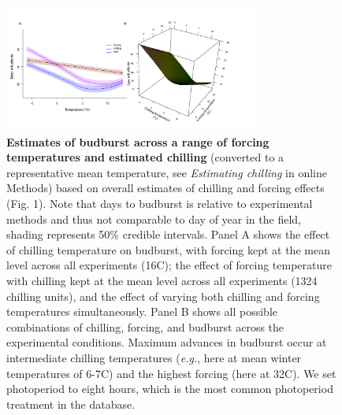 \documentclass{article}
\begin{document}
\begin{figure}[h!]
\centering
\noindent \includegraphics[width=0.75\textwidth]{..//..//analyses/bb_analysis/figures/bbmod_2d3dplot_utah_withPEP.pdf}
\caption{\textbf{Estimates of budburst across a range of forcing temperatures and estimated chilling} (converted to a representative mean temperature, see \emph{Estimating chilling} in online Methods) based on overall estimates of chilling and forcing effects (Fig. 1).  Note that days to budburst is relative to experimental methods and thus not comparable to day of year in the field, shading represents 50\% credible intervals. Panel A shows the effect of chilling temperature on budburst, with forcing kept at the mean level across all experiments (16\degree C);  the effect of forcing temperature with chilling kept at the mean level across all experiments (1324 chilling units), and  the effect of varying both chilling and forcing temperatures simultaneously. Panel B shows all possible combinations of chilling, forcing, and budburst across the experimental conditions.
Maximum advances in budburst occur at intermediate chilling temperatures (\emph{e.g.}, here at mean winter temperatures of 6-7\degree C) and the highest forcing (here at 32\degree C). We set photoperiod to eight hours, which is the most common photoperiod treatment in the database.}%
\label{fig:2dfieldchillutah}
\end{figure}
\end{document}
